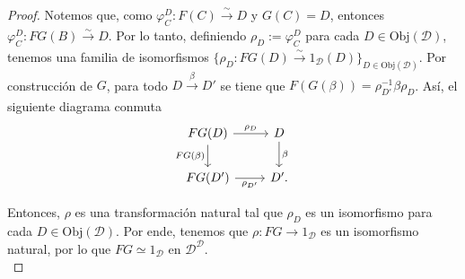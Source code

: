 \documentclass[tesis]{subfiles}
\begin{document}
\begin{proof}
    Notemos que, como $\varphi_C^D:F(C)\xrightarrow[]{\sim} D$ y $G(C)=D$, entonces $\varphi_C^D:FG(B)\xrightarrow[]{\sim}D$. Por lo tanto, definiendo $\rho_D:=\varphi_C^D$ para cada $D\in\text{Obj}(\mathscr{D})$, tenemos una familia de isomorfismos $\{\rho_D:FG(D)\xrightarrow[]{\sim}1_\mathscr{D}(D)\}_{D\in\text{Obj}(\mathscr{D})}$. Por construcción de $G$, para todo $D\xrightarrow[]{\beta} D'$ se tiene que $F(G(\beta)) = \rho_{D'}^{-1}\beta\rho_D$. Así, el siguiente diagrama conmuta
    \[\begin{tikzcd}
    FG(D) \arrow{r}{\rho_D} \arrow{d}[swap]{FG(\beta)} & D \arrow{d}{\beta} \\
    FG(D') \arrow{r}[swap]{\rho_{D'}}  & D'.
    \end{tikzcd}\]
    
    \noindent Entonces, $\rho$ es una transformación natural tal que $\rho_D$ es un isomorfismo para cada $D \in \text{Obj}(\mathscr{D})$. Por ende, tenemos que $\rho:FG\to 1_\mathscr{D}$ es un isomorfismo natural, por lo que $FG\simeq 1_\mathscr{D}$ en $\mathscr{D}^\mathscr{D}$. \\
    

\end{proof}
\end{document}
